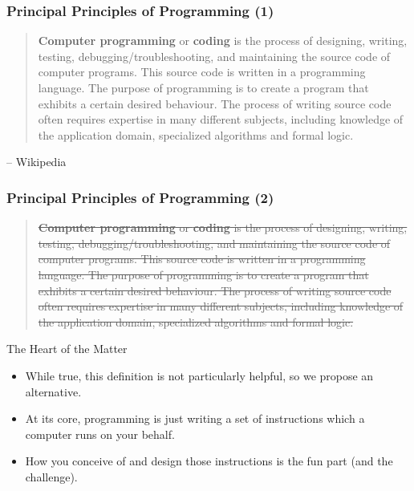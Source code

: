 \documentclass[10pt]{beamer}
\begin{document}
\begin{frame}
  \frametitle{Principal Principles of Programming (1)}
  \begin{quote}
    \textbf{Computer programming} or \textbf{coding} is the process of designing, writing, testing, debugging/troubleshooting, and maintaining the source code of computer programs. 
    This source code is written in a programming language. The purpose of programming is to create a program that exhibits a certain desired behaviour. 
    The process of writing source code often requires expertise in many different subjects, including knowledge of the application domain, specialized algorithms and formal logic.
  \end{quote}
  \begin{flushright}
    \footnotesize -- Wikipedia
  \end{flushright}
\end{frame}

\begin{frame}
  \frametitle{Principal Principles of Programming (2)}
  \begin{quote}
    \footnotesize
    \sout{
      \textbf{Computer programming} or \textbf{coding} is the process of designing, writing, testing, debugging/troubleshooting, and maintaining the source code of computer programs. 
      This source code is written in a programming language. The purpose of programming is to create a program that exhibits a certain desired behaviour. 
      The process of writing source code often requires expertise in many different subjects, including knowledge of the application domain, specialized algorithms and formal logic.
    }
  \end{quote}
  \normalsize
  \begin{block}{The Heart of the Matter}
    \begin{itemize}
      \item While true, this definition is not particularly helpful, so we propose an alternative.
      \item At its core, programming is just writing a set of instructions which a computer runs on your behalf.
      \item How you conceive of and design those instructions is the fun part (and the challenge).
    \end{itemize}
  \end{block}
\end{frame}
\end{document}
